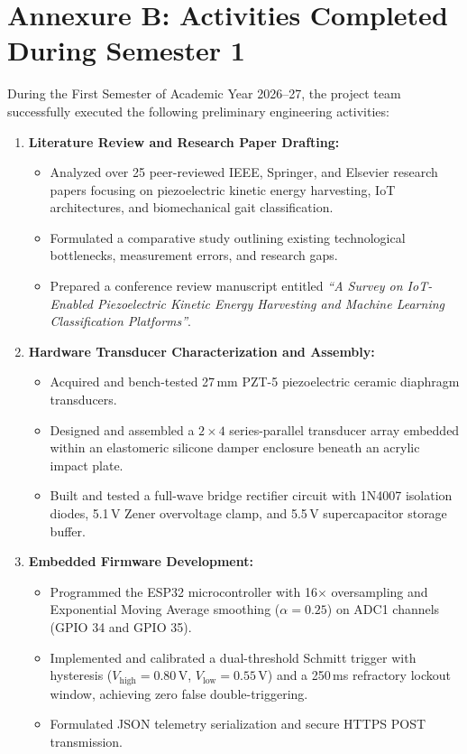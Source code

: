 \chapter*{Annexure B: Activities Completed During Semester 1}

\noindent
During the First Semester of Academic Year 2026--27, the project team successfully executed the following preliminary engineering activities:

\begin{enumerate}
    \item \textbf{Literature Review and Research Paper Drafting:}
    \begin{itemize}
        \item Analyzed over 25 peer-reviewed IEEE, Springer, and Elsevier research papers focusing on piezoelectric kinetic energy harvesting, IoT architectures, and biomechanical gait classification.
        \item Formulated a comparative study outlining existing technological bottlenecks, measurement errors, and research gaps.
        \item Prepared a conference review manuscript entitled \textit{``A Survey on IoT-Enabled Piezoelectric Kinetic Energy Harvesting and Machine Learning Classification Platforms''}.
    \end{itemize}

    \item \textbf{Hardware Transducer Characterization and Assembly:}
    \begin{itemize}
        \item Acquired and bench-tested 27\,mm PZT-5 piezoelectric ceramic diaphragm transducers.
        \item Designed and assembled a $2 \times 4$ series-parallel transducer array embedded within an elastomeric silicone damper enclosure beneath an acrylic impact plate.
        \item Built and tested a full-wave bridge rectifier circuit with 1N4007 isolation diodes, 5.1\,V Zener overvoltage clamp, and 5.5\,V supercapacitor storage buffer.
    \end{itemize}

    \item \textbf{Embedded Firmware Development:}
    \begin{itemize}
        \item Programmed the ESP32 microcontroller with 16$\times$ oversampling and Exponential Moving Average smoothing ($\alpha = 0.25$) on ADC1 channels (GPIO 34 and GPIO 35).
        \item Implemented and calibrated a dual-threshold Schmitt trigger with hysteresis ($V_{\text{high}} = 0.80\,\text{V}$, $V_{\text{low}} = 0.55\,\text{V}$) and a 250\,ms refractory lockout window, achieving zero false double-triggering.
        \item Formulated JSON telemetry serialization and secure HTTPS POST transmission.
    \end{itemize}


\end{enumerate}
